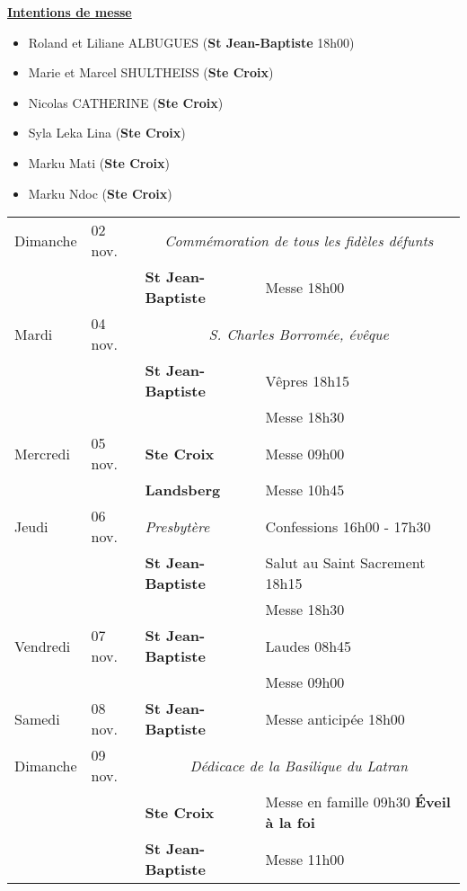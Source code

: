 \documentclass[french,11pt]{article}
\newcommand{\sjb}{\textbf{St Jean-Baptiste}}
\newcommand{\sx}{\textbf{Ste Croix}}
\newcommand{\landsberg}{\textbf{Landsberg}}
\newcommand{\NewsItem}[1]{%
\vspace{3pt}
\underline{\textbf{#1}}
		  }
\begin{document}
\newpage

\NewsItem{Intentions de messe}
\begin{itemize}
\item[\Cross] Roland et Liliane ALBUGUES (\sjb{} 18h00)
\item[\Cross] Marie et Marcel SHULTHEISS (\sx)
\item[\Cross] Nicolas CATHERINE (\sx)
\item[\Cross] Syla Leka Lina (\sx)
\item[\Cross] Marku Mati (\sx)
\item[\Cross] Marku Ndoc (\sx)
\end{itemize}

\begin{tabularx}{\columnwidth}{|p{}p{}|p{}X|}
\hline
Dimanche &  02 nov.  & 
\multicolumn{2}{c|}{
\emph{Commémoration de tous les fidèles défunts}
} \\
& &	\sjb & Messe 18h00 \\
	 \hline
	 \hline
Mardi &  04 nov.  & 
\multicolumn{2}{c|}{
\emph{S. Charles Borromée, évêque}
} \\
& & \sjb & Vêpres 18h15 \\
& &      & Messe 18h30 \\
\hline
Mercredi &  05 nov.  & 		\sx & Messe 09h00 \\
&  & 		\landsberg & Messe 10h45 \\
\hline
Jeudi &  06 nov.   &	\emph{Presbytère} &	Confessions  16h00 - 17h30 \\
 &  &		\sjb &Salut au Saint Sacrement 18h15 \\
& &		&Messe 18h30 \\
\hline
Vendredi &  07 nov.  & 	\sjb & Laudes 08h45 \\
& &		& Messe 09h00 \\
\hline
Samedi &  08 nov.  & 	\sjb & Messe anticipée 18h00 \\
\hline
Dimanche &  09 nov.  & 
\multicolumn{2}{c|}{
\emph{Dédicace de la Basilique du Latran}
} \\
& &		\sx & Messe en famille 09h30 \textbf{Éveil à la foi} \\
& &		\sjb & Messe 11h00 \\
\hline
\end{tabularx}
\end{document}
